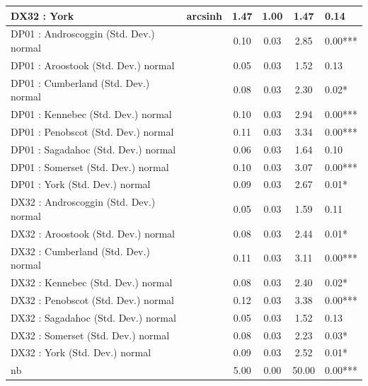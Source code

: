 \begin{table}
\begin{center}
\begin{tabular}{|l|l|c|c|c|l|}
			\hline
			DX32 : York & arcsinh & 1.47 & 1.00 & 1.47 & 0.14 \\
			\hline
			DP01 : Androscoggin (Std. Dev.) normal &  & 0.10 & 0.03 & 2.85 & 0.00*** \\
			\hline
			DP01 : Aroostook (Std. Dev.) normal &  & 0.05 & 0.03 & 1.52 & 0.13 \\
			\hline
			DP01 : Cumberland (Std. Dev.) normal &  & 0.08 & 0.03 & 2.30 & 0.02* \\
			\hline
			DP01 : Kennebec (Std. Dev.) normal &  & 0.10 & 0.03 & 2.94 & 0.00*** \\
			\hline
			DP01 : Penobscot (Std. Dev.) normal &  & 0.11 & 0.03 & 3.34 & 0.00*** \\
			\hline
			DP01 : Sagadahoc (Std. Dev.) normal &  & 0.06 & 0.03 & 1.64 & 0.10 \\
			\hline
			DP01 : Somerset (Std. Dev.) normal &  & 0.10 & 0.03 & 3.07 & 0.00*** \\
			\hline
			DP01 : York (Std. Dev.) normal &  & 0.09 & 0.03 & 2.67 & 0.01* \\
			\hline
			DX32 : Androscoggin (Std. Dev.) normal &  & 0.05 & 0.03 & 1.59 & 0.11 \\
			\hline
			DX32 : Aroostook (Std. Dev.) normal &  & 0.08 & 0.03 & 2.44 & 0.01* \\
			\hline
			DX32 : Cumberland (Std. Dev.) normal &  & 0.11 & 0.03 & 3.11 & 0.00*** \\
			\hline
			DX32 : Kennebec (Std. Dev.) normal &  & 0.08 & 0.03 & 2.40 & 0.02* \\
			\hline
			DX32 : Penobscot (Std. Dev.) normal &  & 0.12 & 0.03 & 3.38 & 0.00*** \\
			\hline
			DX32 : Sagadahoc (Std. Dev.) normal &  & 0.05 & 0.03 & 1.52 & 0.13 \\
			\hline
			DX32 : Somerset (Std. Dev.) normal &  & 0.08 & 0.03 & 2.23 & 0.03* \\
			\hline
			DX32 : York (Std. Dev.) normal &  & 0.09 & 0.03 & 2.52 & 0.01* \\
			\hline
			nb &  & 5.00 & 0.00 & 50.00 & 0.00*** \\
			\hline
		\end{tabular}
	\end{center}
\end{table}